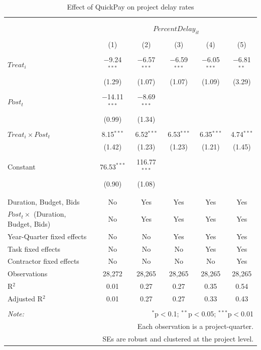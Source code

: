 \documentclass[
]{article}
\begin{document}
\begin{table}[H] \centering 
  \caption{Effect of QuickPay on project delay rates} 
  \label{} 
\small 
\begin{tabular}{@{\extracolsep{-2pt}}lccccc} 
\\[-1.8ex]\hline 
\hline \\[-1.8ex] 
\\[-1.8ex] & \multicolumn{5}{c}{$PercentDelay_{it}$} \\ 
\\[-1.8ex] & (1) & (2) & (3) & (4) & (5)\\ 
\hline \\[-1.8ex] 
 $Treat_i$ & $-$9.24$^{***}$ & $-$6.57$^{***}$ & $-$6.59$^{***}$ & $-$6.05$^{***}$ & $-$6.81$^{**}$ \\ 
  & (1.29) & (1.07) & (1.07) & (1.09) & (3.29) \\ 
  & & & & & \\ 
 $Post_t$ & $-$14.11$^{***}$ & $-$8.69$^{***}$ &  &  &  \\ 
  & (0.99) & (1.34) &  &  &  \\ 
  & & & & & \\ 
 $Treat_i \times Post_t$ & 8.15$^{***}$ & 6.52$^{***}$ & 6.53$^{***}$ & 6.35$^{***}$ & 4.74$^{***}$ \\ 
  & (1.42) & (1.23) & (1.23) & (1.21) & (1.45) \\ 
  & & & & & \\ 
 Constant & 76.53$^{***}$ & 116.77$^{***}$ &  &  &  \\ 
  & (0.90) & (1.08) &  &  &  \\ 
  & & & & & \\ 
\hline \\[-1.8ex] 
Duration, Budget, Bids & No & Yes & Yes & Yes & Yes \\ 
$Post_t \times$  (Duration, Budget, Bids) & No & Yes & Yes & Yes & Yes \\ 
Year-Quarter fixed effects & No & No & Yes & Yes & Yes \\ 
Task fixed effects & No & No & No & Yes & Yes \\ 
Contractor fixed effects & No & No & No & No & Yes \\ 
Observations & 28,272 & 28,265 & 28,265 & 28,265 & 28,265 \\ 
R$^{2}$ & 0.01 & 0.27 & 0.27 & 0.35 & 0.54 \\ 
Adjusted R$^{2}$ & 0.01 & 0.27 & 0.27 & 0.33 & 0.43 \\ 
\hline 
\hline \\[-1.8ex] 
\textit{Note:}  & \multicolumn{5}{r}{$^{*}$p$<$0.1; $^{**}$p$<$0.05; $^{***}$p$<$0.01} \\ 
 & \multicolumn{5}{r}{Each observation is a project-quarter.} \\ 
 & \multicolumn{5}{r}{SEs are robust and clustered at the project level.} \\ 
\end{tabular} 
\end{table}
\end{document}
